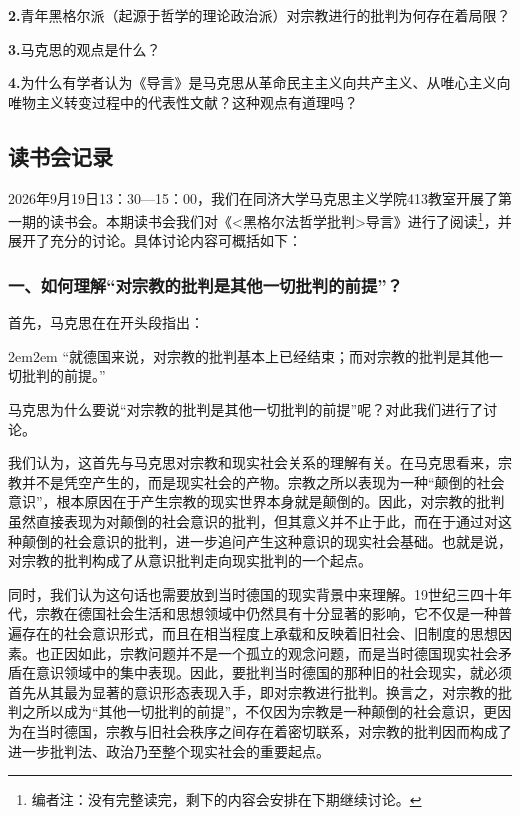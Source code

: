 \documentclass[a4paper,twoside,12pt,AutoFakeBold]{ctexart}
\begin{document}
\textbf{2.}青年黑格尔派（起源于哲学的理论政治派）对宗教进行的批判为何存在着局限？

\textbf{3.}马克思的观点是什么？

\textbf{4.}为什么有学者认为《导言》是马克思从革命民主主义向共产主义、从唯心主义向唯物主义转变过程中的代表性文献？这种观点有道理吗？

\subsection{读书会记录}
2026年9月19日13：30—15：00，我们在同济大学马克思主义学院413教室开展了第一期的读书会。本期读书会我们对《<黑格尔法哲学批判>导言》进行了阅读\footnote{编者注：没有完整读完，剩下的内容会安排在下期继续讨论。}，并展开了充分的讨论。具体讨论内容可概括如下：



\subsubsection{一、如何理解“对宗教的批判是其他一切批判的前提”？}\label{1.1}
首先，马克思在在开头段指出：
\begin{adjustwidth}{2em}{2em}
\qquad\fangsong
“就德国来说，对宗教的批判基本上已经结束；而对宗教的批判是其他一切批判的前提。”
\end{adjustwidth}

马克思为什么要说“对宗教的批判是其他一切批判的前提”呢？对此我们进行了讨论。

我们认为，这首先与马克思对宗教和现实社会关系的理解有关。在马克思看来，宗教并不是凭空产生的，而是现实社会的产物。宗教之所以表现为一种“颠倒的社会意识”，根本原因在于产生宗教的现实世界本身就是颠倒的。因此，对宗教的批判虽然直接表现为对颠倒的社会意识的批判，但其意义并不止于此，而在于通过对这种颠倒的社会意识的批判，进一步追问产生这种意识的现实社会基础。也就是说，对宗教的批判构成了从意识批判走向现实批判的一个起点。

同时，我们认为这句话也需要放到当时德国的现实背景中来理解。19世纪三四十年代，宗教在德国社会生活和思想领域中仍然具有十分显著的影响，它不仅是一种普遍存在的社会意识形式，而且在相当程度上承载和反映着旧社会、旧制度的思想因素。也正因如此，宗教问题并不是一个孤立的观念问题，而是当时德国现实社会矛盾在意识领域中的集中表现。因此，要批判当时德国的那种旧的社会现实，就必须首先从其最为显著的意识形态表现入手，即对宗教进行批判。换言之，对宗教的批判之所以成为“其他一切批判的前提”，不仅因为宗教是一种颠倒的社会意识，更因为在当时德国，宗教与旧社会秩序之间存在着密切联系，对宗教的批判因而构成了进一步批判法、政治乃至整个现实社会的重要起点。
\end{document}
